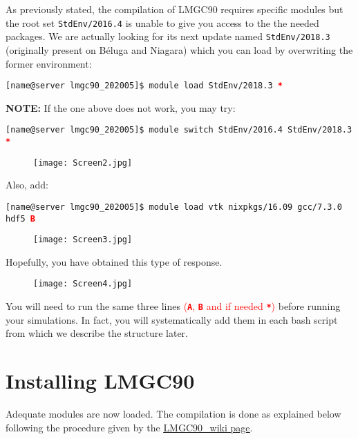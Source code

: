 \documentclass[12pt]{article}
\newcommand*\ruleline[1]{\par\noindent\raisebox{.8ex}{\makebox[\linewidth]{\hrulefill\hspace{1ex}\raisebox{-.8ex}{#1}\hspace{1ex}\hrulefill}}}
\begin{document}
\begin{mdframed}
\vspace{0.5cm}
\ruleline{If you are using \textbf{Cedar} or \textbf{Graham}}

As previously stated, the compilation of LMGC90 requires specific modules but the root set \texttt{StdEnv/2016.4} is unable to give you access to the the needed packages. We are actually looking for its next update named \texttt{StdEnv/2018.3} (originally present on Béluga and Niagara) which you can load by overwriting the former environment:
\begin{tcolorbox}
\texttt{[name@server lmgc90\_202005]\$ module load StdEnv/2018.3 \textcolor{red}{\textbf{*}}} 
\end{tcolorbox}

\textbf{NOTE:} If the one above does not work, you may try:
\begin{tcolorbox}
\texttt{[name@server lmgc90\_202005]\$ module switch StdEnv/2016.4 StdEnv/2018.3 \textcolor{red}{\textbf{*}}} 
\end{tcolorbox}
\begin{figure}[H]
  \centering
  \texttt{[image: Screen2.jpg]}
\end{figure}
\break

\end{mdframed}
\vspace{0.5cm}

Also, add:
\begin{tcolorbox}
\texttt{[name@server lmgc90\_202005]\$ module load vtk nixpkgs/16.09 gcc/7.3.0 hdf5 \textcolor{red}{\textbf{B}}} 
\end{tcolorbox}
\begin{figure}[H]
  \centering
  \texttt{[image: Screen3.jpg]}
\end{figure}

Hopefully, you have obtained this type of response.
\begin{figure}[H]
  \centering
  \texttt{[image: Screen4.jpg]}
\end{figure}


You will need to run the same three lines \textcolor{red}{(\texttt{\textbf{A}}, \texttt{\textbf{B}} and if needed \texttt{\textbf{*}})} before running your simulations. In fact, you will systematically add them in each bash script from which we describe the structure later.


\section*{Installing LMGC90}
Adequate modules are now loaded. The compilation is done as explained below following the procedure given by the \href{https://git-xen.lmgc.univ-montp2.fr/lmgc90/lmgc90_user/-/wikis/Compilation}{\underline{LMGC90\_wiki page}}. 
\end{document}
